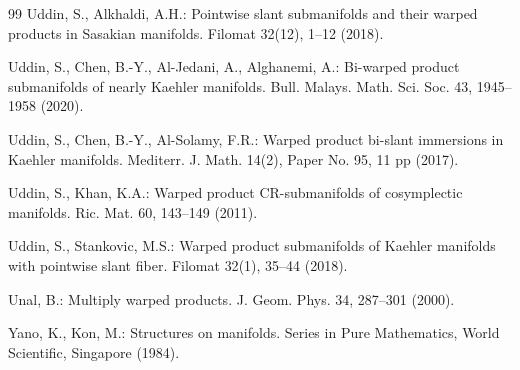 \documentclass[reqno]{amsart}
\theoremstyle{plain}
\theoremstyle{remark}
\numberwithin{equation}{section}
\begin{document}
\begin{thebibliography}{99}
  Uddin, S., Alkhaldi, A.H.: {Pointwise slant submanifolds and their warped products in Sasakian manifolds}. Filomat {32}(12),  1--12  (2018).

  Uddin, S.,  Chen, B.-Y.,  Al-Jedani, A.,   Alghanemi, A.: {Bi-warped product submanifolds of nearly Kaehler manifolds}. Bull. Malays. Math. Sci. Soc.  {43}, 1945--1958  (2020).

 Uddin, S.,  Chen, B.-Y.,  Al-Solamy, F.R.: {Warped product bi-slant immersions in Kaehler manifolds}. Mediterr. J. Math. {14}(2), Paper No. 95, 11 pp  (2017). 

 Uddin, S., Khan, K.A.: Warped product CR-submanifolds of cosymplectic manifolds. Ric. Mat. 60, 143--149 (2011).

  Uddin, S.,   Stankovic, M.S.: {Warped product submanifolds of Kaehler manifolds with pointwise slant fiber}. Filomat {32}(1), 35--44 (2018).

  Unal, B.: {Multiply warped products}. J. Geom. Phys. {34}, 287--301 (2000).

  Yano, K.,   Kon, M.: Structures on manifolds. Series in Pure Mathematics, World Scientific, Singapore (1984).

\end{thebibliography}
\end{document}

